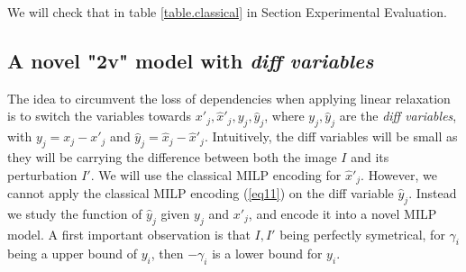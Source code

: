    We will check that in table \ref{table.classical} in Section Experimental Evaluation.


 


	\subsection{A novel "2v" model with {\em diff variables}}

    The idea to circumvent the loss of dependencies when applying linear relaxation is to switch the variables towards $x'_j,\hat{x}'_j, y_j, \hat{y}_j$, where $y_j, \hat{y}_j$ are the {\em diff variables}, with
    $y_j = x_j - x'_j$ and $\hat{y}_j= \hat{x}_j - \hat{x}'_j$. Intuitively, the diff variables will be small as they will be carrying the difference between both the image $I$ and its perturbation $I'$.
    We will use the classical MILP encoding for $\hat{x}'_j$.
    However, we cannot apply the classical MILP encoding (\ref{eq11}) \cite{MILP} on the diff variable $\hat{y}_j$. Instead we study the function of 
    $\hat{y}_j$ given $y_j$ and $x'_j$, and encode it into a novel MILP model.
    A first important observation is that $I,I'$ being perfectly symetrical,
    for $\gamma_i$ being a upper bound of $y_i$, then $-\gamma_i$ is a lower bound 
    for $y_i$.

	

	
	
	
	
